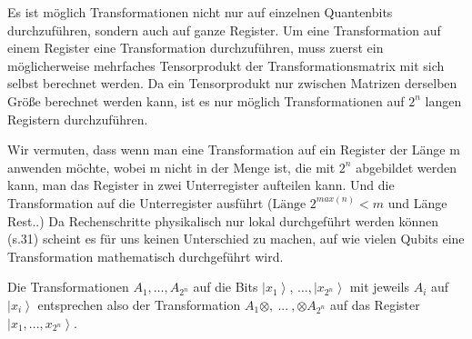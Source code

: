 Es ist möglich Transformationen nicht nur auf einzelnen Quantenbits durchzuführen, sondern auch auf ganze Register. Um eine Transformation auf einem Register eine Transformation durchzuführen, muss zuerst ein möglicherweise mehrfaches Tensorprodukt der Transformationsmatrix mit sich selbst berechnet werden. Da ein Tensorprodukt nur zwischen Matrizen derselben Größe berechnet werden kann, ist es nur möglich Transformationen auf $2^n$ langen Registern durchzuführen. 


Wir vermuten, dass wenn man eine Transformation auf ein Register der Länge m anwenden möchte, wobei m nicht in der Menge ist, die mit $2^n$ abgebildet werden kann, man das Register in zwei Unterregister aufteilen kann. Und die Transformation auf die Unterregister ausführt ($\text{Länge }2^{max(n)} < m$ und Länge Rest..) Da Rechenschritte physikalisch nur lokal durchgeführt werden können (s.31) scheint es für uns keinen Unterschied zu machen, auf wie vielen Qubits eine Transformation mathematisch durchgeführt wird.


Die Transformationen $A_1,\ldots,A_{2^n}$ auf die Bits $\left|\left.x_1\right\rangle\right.$, $\ldots,\left|\left.x_{2^n}\right\rangle\right.$ mit jeweils $A_i$ auf $\left|\left.x_i\right\rangle\right.$ entsprechen also der Transformation $A_1\otimes,\ ...\ ,\otimes A_{2^n}$ auf das Register $\left|\left.x_1,...,x_{2^n}\right\rangle\right.$.

